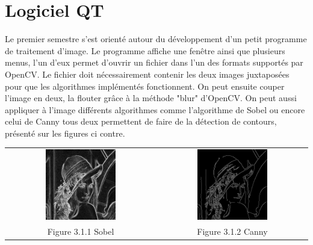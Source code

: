 \documentclass[12pt,a4paper]{report}
\begin{document}
\section{Logiciel QT}
Le premier semestre s'est orienté autour du développement d'un petit programme de traitement d'image. Le programme affiche une fenêtre ainsi que plusieurs menus, l'un d'eux permet d'ouvrir un fichier dans l'un des formats supportés par OpenCV.
Le fichier doit nécessairement contenir les deux images juxtaposées pour que les algorithmes implémentés fonctionnent. On peut ensuite couper l'image en deux, la flouter grâce à la méthode "blur" d'OpenCV. On peut aussi appliquer à l'image différents algorithmes comme l'algorithme de Sobel ou encore celui de Canny tous deux permettent de faire de la détection de contours, présenté sur les figures ci contre.
\begin{center}
\begin{tabular}{cc}
  \vspace{0pt} \includegraphics[width=0.49\textwidth]{sobel.jpg} &
  \vspace{0pt} \includegraphics[width=0.49\textwidth]{canny.jpg} \\
    
  Figure 3.1.1 Sobel & Figure 3.1.2 Canny
\end{tabular}
\end{center}
\end{document}
